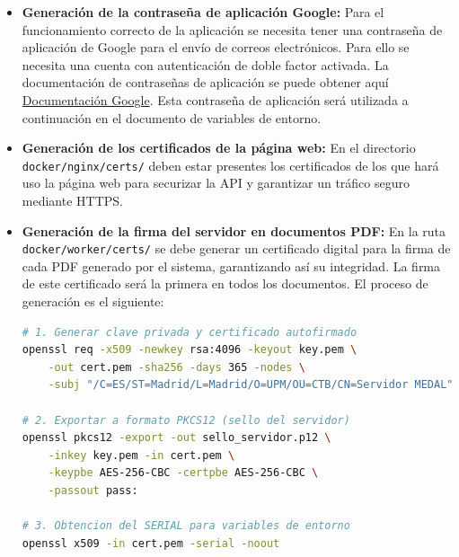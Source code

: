\documentclass[12pt,a4paper]{report}
\begin{document}
\begin{itemize}
    Una vez cargada la imagen mediante \texttt{docker load}, el servicio quedará disponible en el registro local del servidor, permitiendo que \texttt{docker-compose} levante el contenedor de validación de firmas.

    \item \textbf{Generación de la contraseña de aplicación Google:} Para el funcionamiento correcto de la aplicación se necesita tener una contraseña de aplicación de Google para el envío de correos electrónicos. Para ello se necesita una cuenta con autenticación de doble factor activada. La documentación de contraseñas de aplicación se puede obtener aquí \href{https://support.google.com/accounts/answer/185833?hl=es-419}{Documentación Google}. Esta contraseña de aplicación será utilizada a continuación en el documento de variables de entorno.
    \item \textbf{Generación de los certificados de la página web:} En el directorio \texttt{docker/nginx/certs/} deben estar presentes los certificados de los que hará uso la página web para securizar la API y garantizar un tráfico seguro mediante HTTPS.

    \item \textbf{Generación de la firma del servidor en documentos PDF:} En la ruta \texttt{docker/worker/certs/} se debe generar un certificado digital para la firma de cada PDF generado por el sistema, garantizando así su integridad. La firma de este certificado será la primera en todos los documentos. El proceso de generación es el siguiente:

    \begin{lstlisting}[language=bash, 
                       caption={Comandos OpenSSL para certificados de firma}, 
                       label={code:openssl_pdf},
                       basicstyle=\ttfamily\footnotesize,
                       breaklines=true]
# 1. Generar clave privada y certificado autofirmado
openssl req -x509 -newkey rsa:4096 -keyout key.pem \
    -out cert.pem -sha256 -days 365 -nodes \
    -subj "/C=ES/ST=Madrid/L=Madrid/O=UPM/OU=CTB/CN=Servidor MEDAL"

# 2. Exportar a formato PKCS12 (sello del servidor)
openssl pkcs12 -export -out sello_servidor.p12 \
    -inkey key.pem -in cert.pem \
    -keypbe AES-256-CBC -certpbe AES-256-CBC \
    -passout pass:

# 3. Obtencion del SERIAL para variables de entorno
openssl x509 -in cert.pem -serial -noout
    \end{lstlisting}


\end{itemize}
\end{document}
